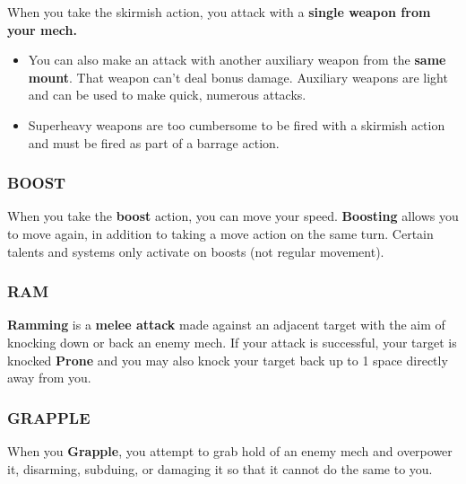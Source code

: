 When you take the skirmish action, you attack with a \textbf{single weapon from your mech.} 
\begin{itemize}
    \item You can also make an attack with another auxiliary weapon from the \textbf{same mount}. That weapon can’t deal bonus damage. Auxiliary weapons are light and can be used to make quick, numerous attacks.
    \item Superheavy weapons are too cumbersome to be fired with a skirmish action and must be fired as part of a barrage action.
\end{itemize}

\subsubsection{BOOST}
When you take the \textbf{boost} action, you can move your speed. \textbf{Boosting} allows you to move again, in addition to taking a move action on the same turn. Certain talents and systems only activate on boosts (not regular movement).

\subsubsection{RAM}
\textbf{Ramming} is a \textbf{melee attack} made against an adjacent target with the aim of knocking down or back an enemy mech. 
If your attack is successful, your target is knocked \textbf{Prone} and you may also knock your target back up to 1 space directly away from you.

\subsubsection{GRAPPLE}
When you \textbf{Grapple}, you attempt to grab hold of an enemy mech and overpower it, disarming, subduing, or damaging it so that it cannot do the same to you. 

